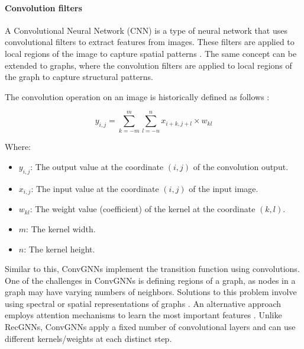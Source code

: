     \paragraph{Convolution filters}
    A Convolutional Neural Network (CNN) is a type of neural network that uses convolutional filters to extract features from images. These filters are applied to local regions of the image to capture spatial patterns \cite{CNNIntro15}. The same concept can be extended to graphs, where the convolution filters are applied to local regions of the graph to capture structural patterns. 

    \begin{minipage}{\dimexpr\linewidth-20pt}
        The convolution operation on an image is historically defined as follows \cite{ImageConvolution13} \cite{TutorialDeepLearningPart2}:
        \par
        \vspace{2em}
        \begin{center}
            \[
            y_{i,j} = \sum_{k=-m}^{m} \sum_{l=-n}^{n} x_{i+k,j+l} \times w_{kl}
            \]
        \end{center}
        \vspace{1em}
    \end{minipage}

    Where:
    \begin{itemize}
        \item \( y_{i,j} \): The output value at the coordinate $ (i,j) $ of the convolution output.
        \item \( x_{i,j} \): The input value at the coordinate $ (i,j) $ of the input image.
        \item \( w_{kl} \): The weight value (coefficient) of the kernel at the coordinate $ (k,l) $.
        \item \( m \): The kernel width.
        \item \( n \): The kernel height.
    \end{itemize}
    
    Similar to this, ConvGNNs implement the transition function using convolutions. One of the challenges in ConvGNNs is defining regions of a graph, as nodes in a graph may have varying numbers of neighbors. Solutions to this problem involve using spectral or spatial representations of graphs \cite{SemiSupervisedClassificationSpectralConvGCN16} \cite{KG22}. An alternative approach employs attention mechanisms to learn the most important features \cite{GAT17}. Unlike RecGNNs, ConvGNNs apply a fixed number of convolutional layers and can use different kernels/weights at each distinct step.

